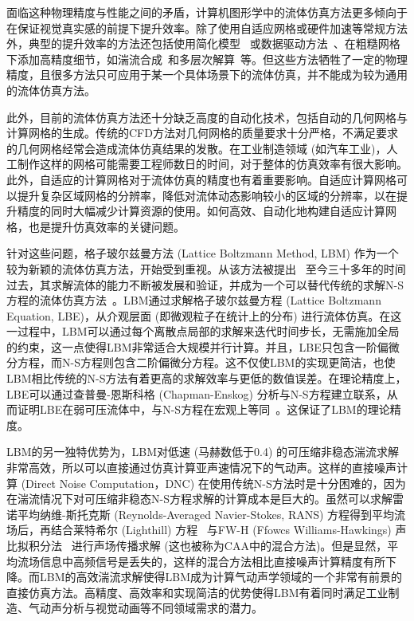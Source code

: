 面临这种物理精度与性能之间的矛盾，计算机图形学中的流体仿真方法更多倾向于在保证视觉真实感的前提下提升效率。除了使用自适应网格或硬件加速等常规方法外，典型的提升效率的方法还包括使用简化模型~\citep{doi.org/10.1111/cgf.12825} 或数据驱动方法~\citep{10.1145/2816795.2818129}、在粗糙网格下添加高精度细节，如湍流合成~\citep{10.1145/1360612.1360649}和多层次解算~\citep{10.1145/1833349.1778785}等。但这些方法牺牲了一定的物理精度，且很多方法只可应用于某一个具体场景下的流体仿真，并不能成为较为通用的流体仿真方法。

此外，目前的流体仿真方法还十分缺乏高度的自动化技术，包括自动的几何网格与计算网格的生成。传统的CFD方法对几何网格的质量要求十分严格，不满足要求的几何网格经常会造成流体仿真结果的发散。在工业制造领域 (如汽车工业)，人工制作这样的网格可能需要工程师数日的时间，对于整体的仿真效率有很大影响。此外，自适应的计算网格对于流体仿真的精度也有着重要影响。自适应计算网格可以提升复杂区域网格的分辨率，降低对流体动态影响较小的区域的分辨率，以在提升精度的同时大幅减少计算资源的使用。如何高效、自动化地构建自适应计算网格，也是提升仿真效率的关键问题。

针对这些问题，格子玻尔兹曼方法 (Lattice Boltzmann Method, LBM) 作为一个较为新颖的流体仿真方法，开始受到重视。从该方法被提出~\citep{PhysRevLett.61.2332} 至今三十多年的时间过去，其求解流体的能力不断被发展和验证，并成为一个可以替代传统的求解N-S方程的流体仿真方法~\citep{ARUMUGAPERUMAL2015955}。LBM通过求解格子玻尔兹曼方程 (Lattice Boltzmann Equation, LBE)，从介观层面 (即微观粒子在统计上的分布) 进行流体仿真。在这一过程中，LBM可以通过每个离散点局部的求解来迭代时间步长，无需施加全局的约束，这一点使得LBM非常适合大规模并行计算。并且，LBE只包含一阶偏微分方程，而N-S方程则包含二阶偏微分方程。这不仅使LBM的实现更简洁，也使LBM相比传统的N-S方法有着更高的求解效率与更低的数值误差。在理论精度上，LBE可以通过查普曼-恩斯科格 (Chapman-Enskog) 分析与N-S方程建立联系，从而证明LBE在弱可压流体中，与N-S方程在宏观上等同~\citep{Y.H.Qian_1993}。这保证了LBM的理论精度。

LBM的另一独特优势为，LBM对低速 (马赫数低于0.4) 的可压缩非稳态湍流求解非常高效，所以可以直接通过仿真计算亚声速情况下的气动声。这样的直接噪声计算 (Direct Noise Computation，DNC) 在使用传统N-S方法时是十分困难的，因为在湍流情况下对可压缩非稳态N-S方程求解的计算成本是巨大的。虽然可以求解雷诺平均纳维-斯托克斯 (Reynolds-Averaged Navier-Stokes, RANS) 方程得到平均流场后，再结合莱特希尔 (Lighthill) 方程~\citep{doi:10.1098/rspa.1952.0060} 与FW-H (Ffowcs Williams-Hawkings) 声比拟积分法~\citep{doi:10.1098/rsta.1969.0031} 进行声场传播求解 (这也被称为CAA中的混合方法)。但是显然，平均流场信息中高频信号是丢失的，这样的混合方法相比直接噪声计算精度有所下降。而LBM的高效湍流求解使得LBM成为计算气动声学领域的一个非常有前景的直接仿真方法。高精度、高效率和实现简洁的优势使得LBM有着同时满足工业制造、气动声分析与视觉动画等不同领域需求的潜力。

